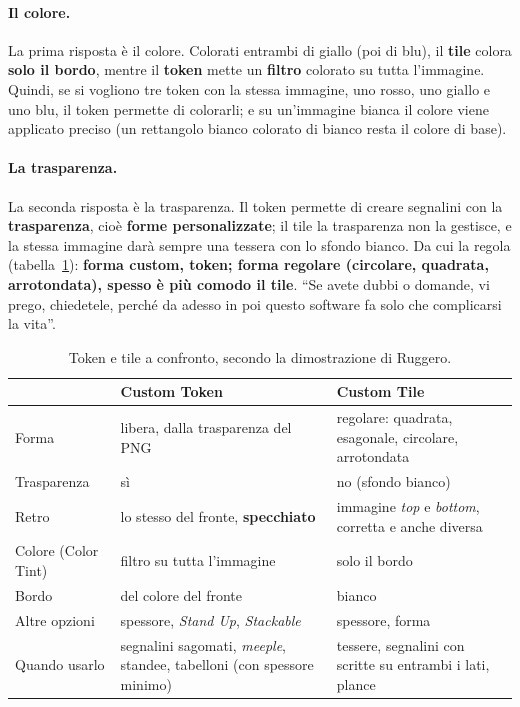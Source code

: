 \paragraph{Il colore.} La prima risposta è il colore. Colorati entrambi di giallo (poi
di blu), il \textbf{tile} colora \textbf{solo il bordo}, mentre il \textbf{token} mette
un \textbf{filtro} colorato su tutta l'immagine. Quindi, se si vogliono tre token con
la stessa immagine, uno rosso, uno giallo e uno blu, il token permette di colorarli; e
su un'immagine bianca il colore viene applicato preciso (un rettangolo bianco colorato
di bianco resta il colore di base).

\paragraph{La trasparenza.} La seconda risposta è la trasparenza. Il token permette di
creare segnalini con la \textbf{trasparenza}, cioè \textbf{forme personalizzate}; il
tile la trasparenza non la gestisce, e la stessa immagine darà sempre una tessera con lo
sfondo bianco. Da cui la regola (tabella~\ref{a8:tab:token-tile}): \textbf{forma
custom, token; forma regolare (circolare, quadrata, arrotondata), spesso è più comodo
il tile}. ``Se avete dubbi o domande, vi prego, chiedetele, perché da adesso in poi
questo software fa solo che complicarsi la vita''.

\begin{table}[htbp]
\centering
\small
\begin{tabular}{@{}p{3.6cm}p{4.4cm}p{4.4cm}@{}}
\toprule
 & \textbf{Custom Token} & \textbf{Custom Tile} \\
\midrule
Forma & libera, dalla trasparenza del PNG & regolare: quadrata, esagonale,
circolare, arrotondata \\
Trasparenza & sì & no (sfondo bianco) \\
Retro & lo stesso del fronte, \textbf{specchiato} & immagine \emph{top} e
\emph{bottom}, corretta e anche diversa \\
Colore (Color Tint) & filtro su tutta l'immagine & solo il bordo \\
Bordo & del colore del fronte & bianco \\
Altre opzioni & spessore, \emph{Stand Up}, \emph{Stackable} & spessore, forma \\
Quando usarlo & segnalini sagomati, \emph{meeple}, standee, tabelloni (con
spessore minimo) & tessere, segnalini con scritte su entrambi i lati, plance \\
\bottomrule
\end{tabular}
\caption{Token e tile a confronto, secondo la dimostrazione di Ruggero.}
\label{a8:tab:token-tile}
\end{table}

